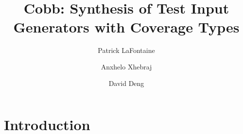 \documentclass[review, sigplan]{acmart}
\begin{document}
\title{Cobb: Synthesis of Test Input Generators with Coverage Types}

\author{Patrick LaFontaine}
\author{Anxhelo Xhebraj}
\author{David Deng}


\renewcommand{\shortauthors}{LaFontaine et al.}










\maketitle

\section{Introduction}
\end{document}
